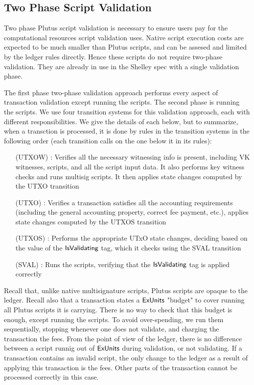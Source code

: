 \subsection{Two Phase Script Validation}
\label{sec:two-phase}

Two phase Plutus script validation is necessary to ensure users pay for the
computational resources script validation uses.
Native script execution costs are expected to be much smaller than Plutus
scripts, and can be assesed and limited by the ledger rules directly.
Hence these scripts do not require two-phase validation. They are already
in use in the Shelley spec with a single validation phase.

The first phase two-phase validation approach
performs every aspect of transaction validation except running the scripts.
The second phase is running the scripts. We use four transition systems
for this validation approach, each with different responsibilities. We
give the details of each below, but to summarize, when a transction is processed,
it is done by rules in the transition systems in the following order
(each transition calls on the one below it in its rules):

\begin{itemize}
  \item[(UTXOW)] : Verifies all the necessary witnessing info is present, including
  VK witnesses, scripts, and all the script input data. It also performs
  key witness checks and runs multisig scripts. It then applies state changes
  computed by the UTXO transition
  \item[(UTXO)] : Verifies a transaction satisfies all the accounting requirements
  (including the general accounting property, correct fee payment, etc.),
  applies state changes computed by the UTXOS transition
  \item[(UTXOS)] : Performs the appropriate UTxO state changes, deciding based on the
  value of the $\mathsf{IsValidating}$ tag, which it checks using the SVAL transition
  \item[(SVAL)] : Runs the scripts, verifying that the $\mathsf{IsValidating}$ tag
  is applied correctly
\end{itemize}


Recall that, unlike native
multisignature scripts, Plutus scripts are opaque to the ledger. Recall also
that a transaction states a $\mathsf{ExUnits}$ "budget" to cover running all Plutus
scripts it is carrying. There is no way to check that this budget is enough,
except running the scripts. To avoid over-spending, we run them sequentially,
stopping whenever one does not validate, and charging the transaction the
fees. From the point of view of the ledger, there is no difference
between a script runnig out of $\mathsf{ExUnits}$ during validation, or not validating.
If a transaction contains an invalid script, the only change to the ledger
as a result of applying this transaction is the fees. Other parts of
the transaction cannot be processed correctly in this case.


